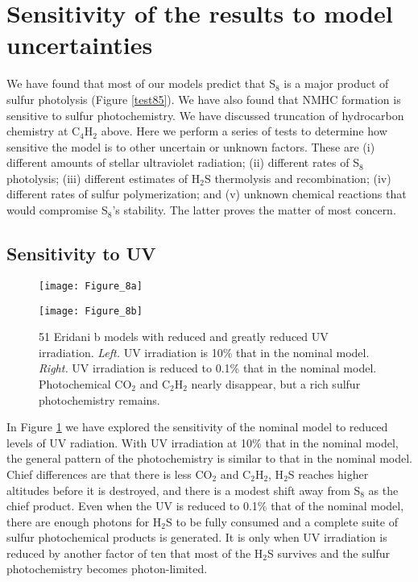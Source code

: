 \documentclass[preprint]{aastex}
\newcounter{reaction}
\begin{document}
\section{Sensitivity of the results to model uncertainties}
\label{section:sensitivity}

We have found that most of our models predict
that S$_8$ is a major product of sulfur photolysis (Figure \ref{test85}).
We have also found that NMHC formation is sensitive to sulfur photochemistry.
We have discussed truncation of hydrocarbon chemistry at C$_4$H$_2$ above.
 Here we perform a series of tests to determine how sensitive the model is to other uncertain or unknown factors.
These are (i) different amounts of stellar ultraviolet radiation;
(ii) different rates of S$_8$ photolysis;  
(iii) different estimates of H$_2$S thermolysis and recombination;
(iv) different rates of sulfur polymerization;
and (v) unknown chemical reactions that would compromise S$_8$'s stability.
The latter proves the matter of most concern. 

\subsection{Sensitivity to UV}

\begin{figure}[!htb]
 \centering
 \begin{minipage}[c]{0.49\textwidth}
   \centering
  \texttt{[image: Figure\_8a]} 
 \end{minipage}
 \begin{minipage}[c]{0.49\textwidth}
   \centering
 \texttt{[image: Figure\_8b]} 
 \end{minipage}
  \caption{\small 51 Eridani b models with reduced and greatly reduced UV irradiation. 
   {\it Left.} UV irradiation is 10\% that in the nominal model.
  {\it Right.} UV irradiation is reduced to 0.1\% that in the nominal model. 
  Photochemical CO$_2$ and C$_2$H$_2$ nearly disappear, but a rich sulfur photochemistry remains.
  }
\label{No_UV}
\end{figure}

In Figure \ref{No_UV} we have explored the sensitivity of the nominal model to reduced levels of UV radiation.
With UV irradiation at 10\% that in the nominal model, the general pattern of the photochemistry
   is similar to that in the nominal model.  Chief differences are that there is less CO$_2$ and 
   C$_2$H$_2$, H$_2$S reaches higher altitudes before it
   is destroyed, and there is a modest shift away from S$_8$ as the chief product.
   Even when the UV is reduced to 0.1\% that of the nominal model, there are enough photons
   for H$_2$S to be fully consumed and a complete suite of sulfur photochemical products is generated.
  It is only when UV irradiation is reduced by another factor of ten that most of the H$_2$S survives
  and the sulfur photochemistry becomes photon-limited.
\end{document}
